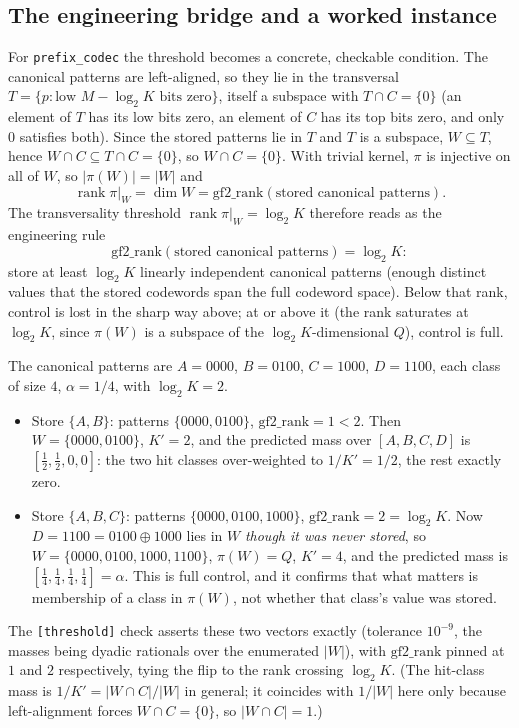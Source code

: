 \documentclass[sigconf,nonacm,anonymous,balance=false]{acmart}
\DeclareMathOperator{\rank}{rank}
\newcommand{\W}{W}                          %
\newcommand{\proj}{\pi}                     %
\newcommand{\Quot}{Q}                       %
\newcommand{\al}{\alpha}                    %
\newcommand{\inter}{\cap}
\begin{document}
\subsection{The engineering bridge and a worked instance}

For \texttt{prefix\_codec} the threshold becomes a concrete, checkable condition. The
canonical patterns are left-aligned, so they lie in the transversal
$T = \{p : \text{low } M - \log_2 K \text{ bits zero}\}$, itself a subspace with
$T \inter C = \{0\}$ (an element of $T$ has its low bits zero, an element of $C$ has its
top bits zero, and only $0$ satisfies both). Since the stored patterns lie in $T$ and
$T$ is a subspace, $\W \subseteq T$, hence $\W \inter C \subseteq T \inter C = \{0\}$,
so $\W \inter C = \{0\}$. With trivial kernel, $\proj$ is injective on all of $\W$, so
$|\proj(\W)| = |\W|$ and
\begin{equation}
  \rank \proj|_{\W} = \dim \W = \mathrm{gf2\_rank}(\text{stored canonical patterns}).
  \label{eq:bridge}
\end{equation}
The transversality threshold $\rank \proj|_{\W} = \log_2 K$ therefore reads as the
engineering rule
\[
  \mathrm{gf2\_rank}(\text{stored canonical patterns}) = \log_2 K:
\]
store at least $\log_2 K$ linearly independent canonical patterns (enough distinct
values that the stored codewords span the full codeword space). Below that rank,
control is lost in the sharp way above; at or above it (the rank saturates at $\log_2 K$,
since $\proj(\W)$ is a subspace of the $\log_2 K$-dimensional $\Quot$), control is full.

\begin{example}[The length-2 codec on $M = 4$, $K = 4$]
\label{ex:m4}
The canonical patterns are $A = 0000$, $B = 0100$, $C = 1000$, $D = 1100$, each class of
size $4$, $\al = 1/4$, with $\log_2 K = 2$.
\begin{itemize}
  \item Store $\{A, B\}$: patterns $\{0000, 0100\}$, $\mathrm{gf2\_rank} = 1 < 2$. Then
  $\W = \{0000, 0100\}$, $K' = 2$, and the predicted mass over $[A,B,C,D]$ is
  $[\tfrac12, \tfrac12, 0, 0]$: the two hit classes over-weighted to $1/K' = 1/2$, the
  rest exactly zero.
  \item Store $\{A, B, C\}$: patterns $\{0000, 0100, 1000\}$, $\mathrm{gf2\_rank} = 2 =
  \log_2 K$. Now $D = 1100 = 0100 \oplus 1000$ lies in $\W$ \emph{though it was never
  stored}, so $\W = \{0000, 0100, 1000, 1100\}$, $\proj(\W) = \Quot$, $K' = 4$, and the
  predicted mass is $[\tfrac14, \tfrac14, \tfrac14, \tfrac14] = \al$. This is full
  control, and it confirms that what matters is membership of a class in $\proj(\W)$, not
  whether that class's value was stored.
\end{itemize}
The \texttt{[threshold]} check asserts these two vectors exactly (tolerance $10^{-9}$,
the masses being dyadic rationals over the enumerated $|\W|$), with $\mathrm{gf2\_rank}$
pinned at $1$ and $2$ respectively, tying the flip to the rank crossing $\log_2 K$. (The
hit-class mass is $1/K' = |\W \inter C|/|\W|$ in general; it coincides with $1/|\W|$ here
only because left-alignment forces $\W \inter C = \{0\}$, so $|\W \inter C| = 1$.)
\end{example}
\end{document}
